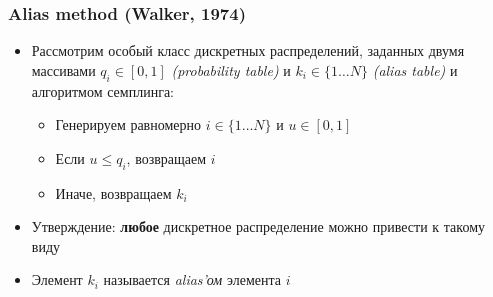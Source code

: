 \documentclass[10pt]{beamer}
\begin{document}
\begin{frame}
\frametitle{Alias method (Walker, 1974)}
\begin{itemize}
\item Рассмотрим особый класс дискретных распределений, заданных двумя массивами \begin{math}q_i \in [0, 1]\end{math} \textit{(probability table)} и \begin{math}k_i \in \{1\dots N\}\end{math} \textit{(alias table)} и алгоритмом семплинга:
\pause
\begin{itemize}
\item Генерируем равномерно \begin{math}i \in \{1\dots N\}\end{math} и \begin{math}u \in [0, 1]\end{math}
\pause
\item Если \begin{math}u \leq q_i\end{math}, возвращаем \begin{math}i\end{math}
\pause
\item Иначе, возвращаем \begin{math}k_i\end{math}
\end{itemize}
\pause
\item Утверждение: \textbf{любое} дискретное распределение можно привести к такому виду
\pause
\item Элемент \begin{math}k_i\end{math} называется \textit{alias'ом} элемента \begin{math}i\end{math}
\end{itemize}
\end{frame}
\end{document}
